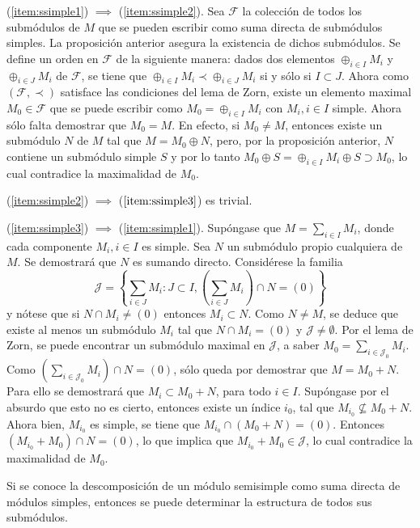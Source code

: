 \begin{proof*}
(\ref{item:ssimple1}) $\implies$ (\ref{item:ssimple2}). Sea $\mathcal{F}$ la colección de todos los submódulos de $M$ que se pueden escribir como suma directa de submódulos simples. La proposición anterior asegura la existencia de dichos submódulos. Se define un orden en $\mathcal{F}$ de la siguiente manera: dados dos elementos $\oplus_{i \in I}M_i$ y $\oplus_{i \in J}M_i$ de $\mathcal{F}$, se tiene que $\oplus_{i \in I}M_i  \prec \oplus_{i \in J}M_i$ si y sólo si $I \subset J$. 
Ahora como $(\mathcal{F, \prec})$ satisface las condiciones del lema de Zorn, existe un elemento maximal $M_0 \in \mathcal{F}$ que se puede escribir como $M_0 = \oplus_{i \in I}M_i$ con $M_i, i \in I$ simple.
Ahora sólo falta demostrar que $M_0 = M$. En efecto, si $M_0 \neq M$, entonces existe un submódulo $N$ de $M$ tal que $M = M_0 \oplus N$, pero, por la proposición anterior, $N$ contiene un submódulo simple $S$ y por lo tanto $M_0 \oplus S = \oplus_{i \in I}M_i \oplus S \supset M_0$, lo cual contradice la maximalidad de $M_0$.

(\ref{item:ssimple2}) $\implies$ ($\ref{item:ssimple3}$) es trivial.

(\ref{item:ssimple3}) $\implies$ (\ref{item:ssimple1}). Supóngase que $M = \sum_{i \in I}M_i$, donde cada componente $M_i, i \in I$ es simple. Sea $N$ un submódulo propio cualquiera de $M$. Se demostrará que $N$ es sumando directo. 
Considérese la familia \[ \mathcal{J} = \left\{ \sum_{i \in J} M_i \colon J \subset I, \left(\sum_{i \in J}M_i \right) \cap N = (0)  \right\} \] y nótese que si $N \cap M_i \neq (0)$ entonces $M_i \subset N$. Como $N \neq M$, se deduce que existe al menos un submódulo $M_i$ tal que $N \cap M_i = (0)$ y $\mathcal{J} \neq \emptyset$. Por el lema de Zorn, se puede encontrar un submódulo maximal en $\mathcal{J}$, a saber $M_0 = \sum_{i \in \mathcal{J}_0}M_i$. Como $\left( \sum_{i \in \mathcal{J}_0}M_i  \right) \cap N = (0)$, sólo queda por demostrar que $M = M_0 + N$. Para ello se demostrará que $M_i \subset M_0 + N$, para todo $i \in I$. Supóngase por el absurdo que esto no es cierto, entonces existe un índice $i_{0}$, tal que $M_{i_0} \nsubseteq M_0 + N $. Ahora bien, $M_{i_0}$ es simple, se tiene que $M_{i_0} \cap (M_0 + N) = (0)$. Entonces $(M_{i_0} + M_0)\cap N =(0)$, lo que implica que $M_{i_0} + M_0 \in \mathcal{J}$, lo cual contradice la maximalidad de $M_0$.
\end{proof*}
Si se conoce la descomposición de un módulo semisimple como suma directa de módulos simples, entonces se puede determinar la estructura de todos sus submódulos. 
